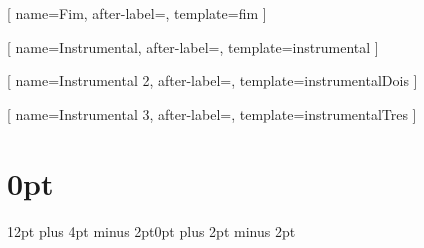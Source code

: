 [
  name=Fim,
  after-label=\noindent,
  template=fim
  ]

[
  name=Instrumental,
  after-label=\noindent,
  template=instrumental
  ]

[
  name={Instrumental 2},
  after-label=\noindent,
  template=instrumentalDois
  ]
    
[
  name={Instrumental 3},
  after-label=\noindent,
  template=instrumentalTres
  ]

\usepackage[bottom=1cm,top=1cm,left=1cm,right=1cm]{geometry}


\usepackage{xcolor}
\usepackage{titlesec}    
    \setcounter{secnumdepth}{0}
    \titleformat{\section}{\huge\bfseries}{\thesection}{1em}{}
    \titlespacing\section{0pt}{12pt plus 4pt minus 2pt}{0pt plus 2pt minus 2pt}
    \titleformat{\subsection}{\small\color{gray}}{\thesubsection}{1em}{}

\usepackage{multicol}
\usepackage[xparse, skins, breakable]{tcolorbox}
\usepackage{tikz}
\usetikzlibrary{shapes.geometric,arrows,positioning,fit,calc,}
\usepackage{pgf}
\usepackage{varwidth}

\newcommand\ifempty[1]{\def\temp{#1} \ifx\temp\empty }

\newcommand\mymacro[1]{\ifempty{#1} \else \node[circle,
fill=white,
inner sep=0pt,
draw=black,
minimum size=.45cm,
ultra thick,
align=center,
text=black,
font=\sffamily\bfseries
] at (0.35,0.35) {\tiny#1}; \fi }

\newcommand{\sequence}[2]{
  \begin{tikzpicture}
    \node[circle,
    inner sep=0pt,
    minimum size=.9cm,
    fill=black,
    draw=black,
    baseline = (current bounding box.center), %
    ultra thick,
    align=center,
    text=white,
    text width=.7cm,
    font=\sffamily\bfseries\small
    ] {\ifthenelse{\equal{#1}{V1}}
        {V}
        {\ifthenelse{\equal{#1}{R1}}
            {R}
            {\ifthenelse{\equal{#1}{It1}}
                {It}
                {#1}
                }}};
    \mymacro{#2}
  \end{tikzpicture}
  }

